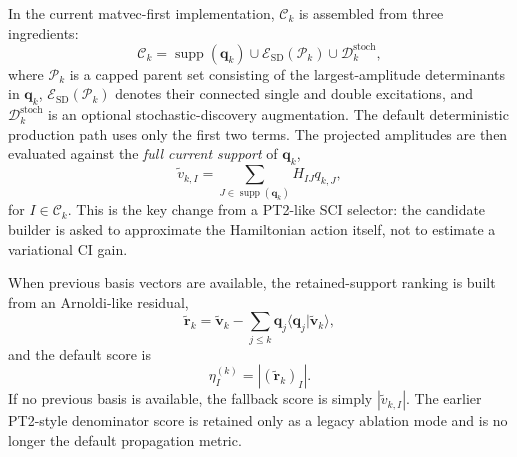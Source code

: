 \documentclass[aip,jcp,preprint,longbibliography]{revtex4-2}
\begin{document}
In the current matvec-first implementation, $\mathcal{C}_k$ is assembled from three ingredients:
\begin{equation}
\mathcal{C}_k
=
\operatorname{supp}(\bm q_k)
\cup
\mathcal{E}_{\mathrm{SD}}(\mathcal{P}_k)
\cup
\mathcal{D}_k^{\mathrm{stoch}},
\end{equation}
where $\mathcal{P}_k$ is a capped parent set consisting of the largest-amplitude determinants in $\bm q_k$, $\mathcal{E}_{\mathrm{SD}}(\mathcal{P}_k)$ denotes their connected single and double excitations, and $\mathcal{D}_k^{\mathrm{stoch}}$ is an optional stochastic-discovery augmentation. The default deterministic production path uses only the first two terms. The projected amplitudes are then evaluated against the \emph{full current support} of $\bm q_k$,
\begin{equation}
\widetilde v_{k,I}
=
\sum_{J\in \operatorname{supp}(\bm q_k)}
H_{IJ} q_{k,J},
\label{eq:score}
\end{equation}
for $I \in \mathcal{C}_k$. This is the key change from a PT2-like SCI selector: the candidate builder is asked to approximate the Hamiltonian action itself, not to estimate a variational CI gain.

When previous basis vectors are available, the retained-support ranking is built from an Arnoldi-like residual,
\begin{equation}
\widetilde{\bm r}_k
=
\widetilde{\bm v}_k
-
\sum_{j \le k}
\bm q_j
\langle \bm q_j | \widetilde{\bm v}_k \rangle,
\end{equation}
and the default score is
\begin{equation}
\eta_I^{(k)} = |(\widetilde{\bm r}_k)_I|.
\end{equation}
If no previous basis is available, the fallback score is simply $|\widetilde v_{k,I}|$. The earlier PT2-style denominator score is retained only as a legacy ablation mode and is no longer the default propagation metric.
\end{document}

